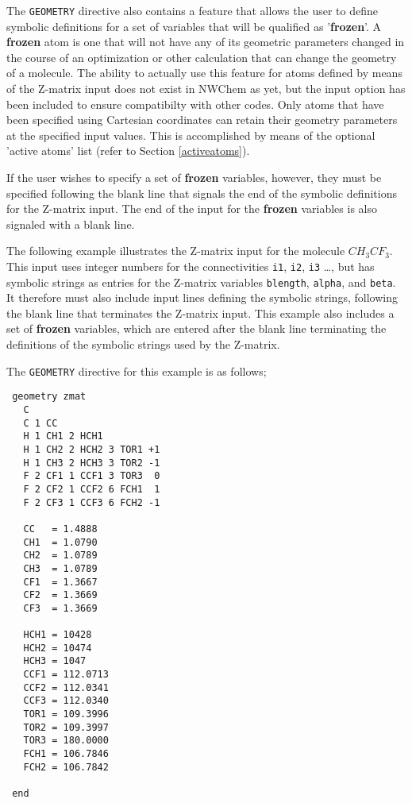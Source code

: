 The \verb+GEOMETRY+ directive also contains a feature that allows the user
to define symbolic definitions for a set of variables that will be 
qualified as '{\bf frozen}'.  A {\bf frozen} atom is one that will not
have any of its geometric parameters changed in the course of an optimization
or other calculation that can change the geometry of a molecule.  
The ability to actually use this feature
for atoms defined by means of the Z-matrix input does not exist in NWChem
as yet, but the input option has been included to ensure compatibilty with
other codes.  Only atoms that have been specified using Cartesian coordinates
can retain their geometry parameters at the specified input values.  This
is accomplished by means of the optional 'active atoms' list (refer to Section
\ref{activeatoms}).

If the user wishes to specify a set of {\bf frozen} variables, however,
they must be specified following the blank line that signals the end of 
the symbolic definitions for the Z-matrix input.  The end of the input
for the {\bf frozen} variables is also signaled with a blank line.

The following example illustrates the Z-matrix input for the molecule
$CH_3CF_3$.  This input uses integer numbers for the connectivities {\tt i1},
{\tt i2}, {\tt i3} \ldots, but has symbolic strings as entries for the Z-matrix
variables {\tt blength}, {\tt alpha}, and {\tt beta}.  It therefore must
also include input lines defining the symbolic strings, following the blank
line that terminates the Z-matrix input.  This example also includes a set
of {\bf frozen} variables, which are entered after the blank line terminating
the definitions of the symbolic strings used by the Z-matrix.




The \verb+GEOMETRY+ directive for this example is as follows;

\begin{verbatim}
 geometry zmat
   C 
   C 1 CC 
   H 1 CH1 2 HCH1 
   H 1 CH2 2 HCH2 3 TOR1 +1 
   H 1 CH3 2 HCH3 3 TOR2 -1 
   F 2 CF1 1 CCF1 3 TOR3  0 
   F 2 CF2 1 CCF2 6 FCH1  1 
   F 2 CF3 1 CCF3 6 FCH2 -1

   CC   = 1.4888 
   CH1  = 1.0790 
   CH2  = 1.0789  
   CH3  = 1.0789  
   CF1  = 1.3667 
   CF2  = 1.3669 
   CF3  = 1.3669

   HCH1 = 10428 
   HCH2 = 10474 
   HCH3 = 1047 
   CCF1 = 112.0713 
   CCF2 = 112.0341 
   CCF3 = 112.0340 
   TOR1 = 109.3996 
   TOR2 = 109.3997 
   TOR3 = 180.0000 
   FCH1 = 106.7846 
   FCH2 = 106.7842

 end   
\end{verbatim}

